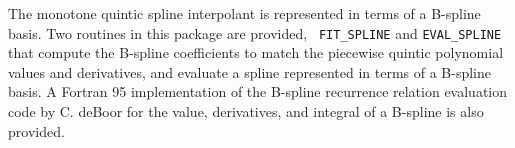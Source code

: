 

The monotone quintic spline interpolant is represented in terms of a
B-spline basis. Two routines in this package are provided, {\tt
  FIT\_SPLINE} and {\tt EVAL\_SPLINE} that compute the B-spline
coefficients to match the piecewise quintic polynomial values and
derivatives, and evaluate a spline represented in terms of a B-spline
basis. A Fortran 95 implementation of the B-spline recurrence relation
evaluation code by C. deBoor for the value, derivatives, and integral
of a B-spline is also provided.

%
%
%
%                                                                
%
%
%
%
